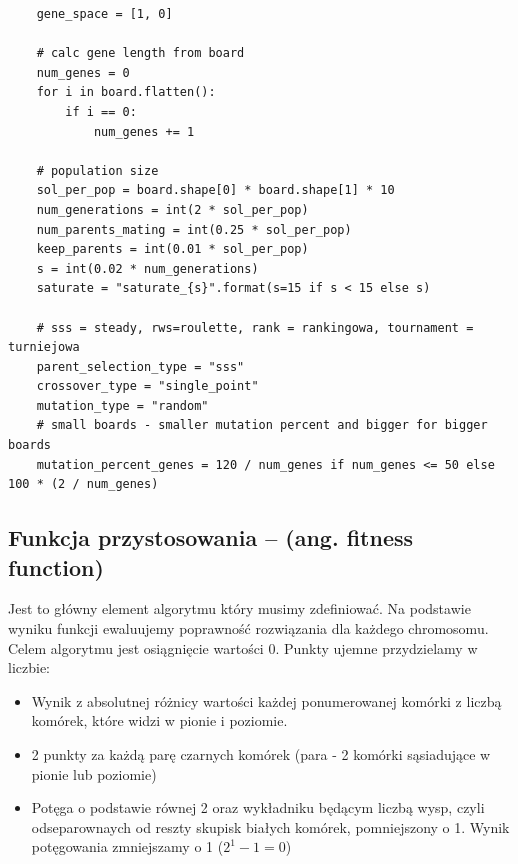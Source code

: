 \documentclass{article}
\begin{document}
\begin{verbatim}
    gene_space = [1, 0]

    # calc gene length from board
    num_genes = 0
    for i in board.flatten():
        if i == 0:
            num_genes += 1

    # population size
    sol_per_pop = board.shape[0] * board.shape[1] * 10
    num_generations = int(2 * sol_per_pop)
    num_parents_mating = int(0.25 * sol_per_pop)
    keep_parents = int(0.01 * sol_per_pop)
    s = int(0.02 * num_generations)
    saturate = "saturate_{s}".format(s=15 if s < 15 else s)

    # sss = steady, rws=roulette, rank = rankingowa, tournament = turniejowa
    parent_selection_type = "sss"
    crossover_type = "single_point"
    mutation_type = "random"
    # small boards - smaller mutation percent and bigger for bigger boards
    mutation_percent_genes = 120 / num_genes if num_genes <= 50 else 100 * (2 / num_genes)
\end{verbatim}

\subsection{Funkcja przystosowania – (ang. fitness function)}
Jest to główny element algorytmu który musimy zdefiniować. Na podstawie wyniku funkcji ewaluujemy poprawność rozwiązania dla każdego chromosomu. Celem algorytmu jest osiągnięcie wartości 0. Punkty ujemne przydzielamy w liczbie:\\

\begin{itemize}
  \item Wynik z absolutnej różnicy wartości każdej ponumerowanej komórki z liczbą komórek, które widzi w pionie i poziomie.
  \item 2 punkty za każdą parę czarnych komórek (para - 2 komórki sąsiadujące w pionie lub poziomie)
  \item Potęga o podstawie równej 2 oraz wykładniku będącym liczbą wysp, czyli odseparownaych od reszty skupisk białych komórek, pomniejszony o 1. Wynik potęgowania zmniejszamy o 1 ($2^1 - 1 = 0$)
\end{itemize}
\end{document}
